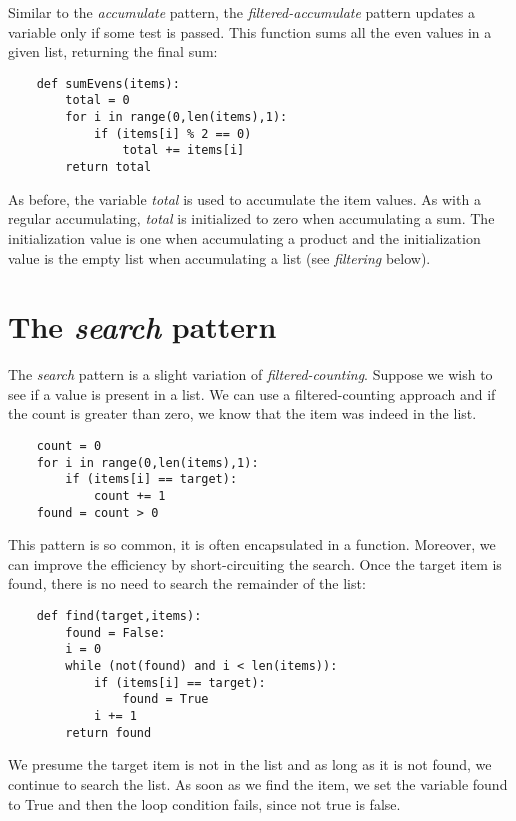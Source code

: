Similar to the {\it accumulate} pattern, the {\it filtered-accumulate} pattern
updates a variable only if some test is passed.
This function sums all the even values in a given list, returning
the final sum:

\begin{verbatim}
    def sumEvens(items):
        total = 0
        for i in range(0,len(items),1):
            if (items[i] % 2 == 0)
                total += items[i]
        return total
\end{verbatim}

As before, the variable {\it total} is used to accumulate the item
values. As with a regular accumulating, {\it total} is initialized to zero when
accumulating a sum. The initialization value is one when
accumulating a product and the initialization value is
the empty list when accumulating a list (see {\it filtering} below).

\section{The {\it search} pattern}

The {\it search} pattern is a slight variation of {\it filtered-counting}.
Suppose we wish to see if a value is present in a list. We can
use a filtered-counting approach and if the count is greater than
zero, we know that the item was indeed in the list.

\begin{verbatim}
    count = 0
    for i in range(0,len(items),1):
        if (items[i] == target):
            count += 1
    found = count > 0
\end{verbatim}

This pattern is so common, it is often encapsulated in a function.
Moreover, we can improve the efficiency by short-circuiting the
search. Once the target item is found, there is no need to 
search the remainder of the list:

\begin{verbatim}
    def find(target,items):
        found = False:
        i = 0
        while (not(found) and i < len(items)):
            if (items[i] == target):
                found = True
            i += 1
        return found
\end{verbatim}

We presume the target item is not in the list and 
as long as it is not found, we continue to search the list.
As soon as we find the item, we set the variable found
to True and then the loop condition fails, since
not true is false.

